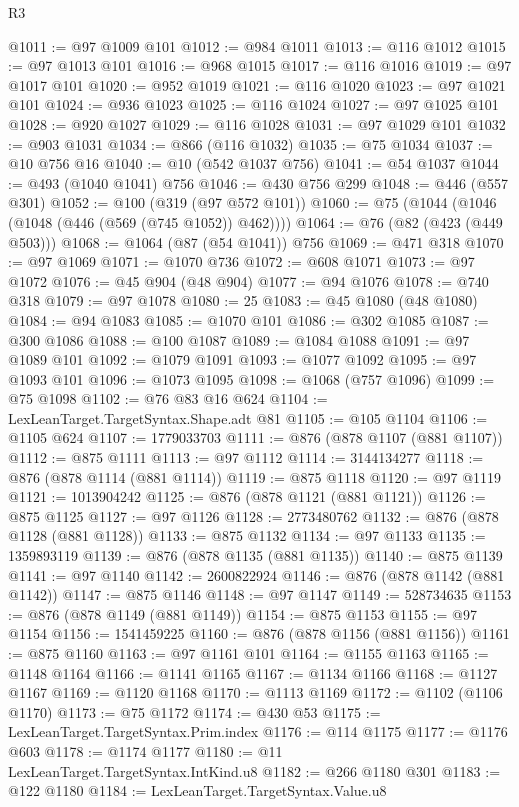 \begin{lexlean}{R3}
\begin{coremodule}
@1011 := @97 @1009 @101
@1012 := @984 @1011
@1013 := @116 @1012
@1015 := @97 @1013 @101
@1016 := @968 @1015
@1017 := @116 @1016
@1019 := @97 @1017 @101
@1020 := @952 @1019
@1021 := @116 @1020
@1023 := @97 @1021 @101
@1024 := @936 @1023
@1025 := @116 @1024
@1027 := @97 @1025 @101
@1028 := @920 @1027
@1029 := @116 @1028
@1031 := @97 @1029 @101
@1032 := @903 @1031
@1034 := @866 (@116 @1032)
@1035 := @75 @1034
@1037 := @10 @756 @16
@1040 := @10 (@542 @1037 @756)
@1041 := @54 @1037
@1044 := @493 (@1040 @1041) @756
@1046 := @430 @756 @299
@1048 := @446 (@557 @301)
@1052 := @100 (@319 (@97 @572 @101))
@1060 := @75 (@1044 (@1046 (@1048 (@446 (@569 (@745 @1052)) @462))))
@1064 := @76 (@82 (@423 (@449 @503)))
@1068 := @1064 (@87 (@54 @1041)) @756
@1069 := @471 @318
@1070 := @97 @1069
@1071 := @1070 @736
@1072 := @608 @1071
@1073 := @97 @1072
@1076 := @45 @904 (@48 @904)
@1077 := @94 @1076
@1078 := @740 @318
@1079 := @97 @1078
@1080 := 25
@1083 := @45 @1080 (@48 @1080)
@1084 := @94 @1083
@1085 := @1070 @101
@1086 := @302 @1085
@1087 := @300 @1086
@1088 := @100 @1087
@1089 := @1084 @1088
@1091 := @97 @1089 @101
@1092 := @1079 @1091
@1093 := @1077 @1092
@1095 := @97 @1093 @101
@1096 := @1073 @1095
@1098 := @1068 (@757 @1096)
@1099 := @75 @1098
@1102 := @76 @83 @16 @624
@1104 := LexLeanTarget.TargetSyntax.Shape.adt @81
@1105 := @105 @1104
@1106 := @1105 @624
@1107 := 1779033703
@1111 := @876 (@878 @1107 (@881 @1107))
@1112 := @875 @1111
@1113 := @97 @1112
@1114 := 3144134277
@1118 := @876 (@878 @1114 (@881 @1114))
@1119 := @875 @1118
@1120 := @97 @1119
@1121 := 1013904242
@1125 := @876 (@878 @1121 (@881 @1121))
@1126 := @875 @1125
@1127 := @97 @1126
@1128 := 2773480762
@1132 := @876 (@878 @1128 (@881 @1128))
@1133 := @875 @1132
@1134 := @97 @1133
@1135 := 1359893119
@1139 := @876 (@878 @1135 (@881 @1135))
@1140 := @875 @1139
@1141 := @97 @1140
@1142 := 2600822924
@1146 := @876 (@878 @1142 (@881 @1142))
@1147 := @875 @1146
@1148 := @97 @1147
@1149 := 528734635
@1153 := @876 (@878 @1149 (@881 @1149))
@1154 := @875 @1153
@1155 := @97 @1154
@1156 := 1541459225
@1160 := @876 (@878 @1156 (@881 @1156))
@1161 := @875 @1160
@1163 := @97 @1161 @101
@1164 := @1155 @1163
@1165 := @1148 @1164
@1166 := @1141 @1165
@1167 := @1134 @1166
@1168 := @1127 @1167
@1169 := @1120 @1168
@1170 := @1113 @1169
@1172 := @1102 (@1106 @1170)
@1173 := @75 @1172
@1174 := @430 @53
@1175 := LexLeanTarget.TargetSyntax.Prim.index
@1176 := @114 @1175
@1177 := @1176 @603
@1178 := @1174 @1177
@1180 := @11 LexLeanTarget.TargetSyntax.IntKind.u8
@1182 := @266 @1180 @301
@1183 := @122 @1180
@1184 := LexLeanTarget.TargetSyntax.Value.u8

\end{coremodule}
\end{lexlean}
